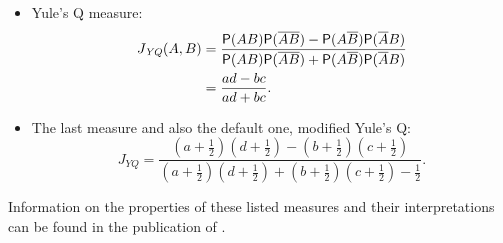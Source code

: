 \begin{itemize}
\begin{align}
\begin{split}
				\ln\left(\frac{\Prob(AB\mid y)}{\Prob(A\overline{B}\mid y)
					\Prob(\overline{A}B\mid y)}\right) \\
				& = \frac{a+b}{N}\frac{a+c}{N}\ln\left(\frac{aN}{bc}\right).
			\end{split}
			\label{St_jointness}
		\end{align}
	\item Yule's Q measure:
		\begin{align}
			\begin{split}
				J_{\mathit{YQ}}(A,B) & = \frac{\mathsf{P}(AB)\mathsf{P}(\overline{AB})-\mathsf{P}(A\overline{B})\mathsf{P}(\overline{A}B)}
				{\mathsf{P}(AB)\mathsf{P}(\overline{AB})+\mathsf{P}(A\overline{B})\mathsf{P}(\overline{A}B)} \\
				& = \frac{ad - bc}{ad + bc}.
			\end{split}
			\label{Yq_jointness}
		\end{align}
	\item The last  measure and also the default one,
		modified Yule's Q:
		\begin{equation}		
			J_{\mathit{YQ}} = \frac
			{\left(a+\frac{1}{2}\right)\left(d+\frac{1}{2}\right) -
				\left(b+\frac{1}{2}\right)\left(c+\frac{1}{2}\right)} 
			{\left(a+\frac{1}{2}\right)\left(d+\frac{1}{2}\right) +
				\left(b+\frac{1}{2}\right)\left(c+\frac{1}{2}\right) - \frac{1}{2}}.
			\label{YqM_jointness}
		\end{equation}
\end{itemize}

Information on the properties of these listed measures
and their interpretations can be found in the publication
of \cite{Hofmarcher2018}.
